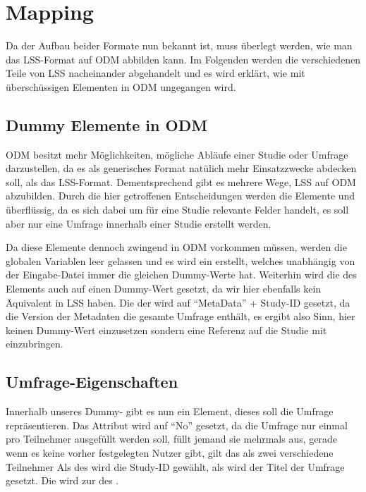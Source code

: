 \section{Mapping}

Da der Aufbau beider Formate nun bekannt ist, muss überlegt werden, wie man das LSS-Format auf ODM abbilden kann. Im Folgenden werden die verschiedenen Teile von LSS nacheinander abgehandelt und es wird erklärt, wie mit überschüssigen Elementen in ODM ungegangen wird.

\subsection{Dummy Elemente in ODM}


ODM besitzt mehr Möglichkeiten, mögliche Abläufe einer Studie oder Umfrage darzustellen, da es als generisches Format natülich mehr Einsatzzwecke abdecken soll, als das LSS-Format.
Dementsprechend gibt es mehrere Wege, LSS auf ODM abzubilden.
Durch die hier getroffenen Entscheidungen werden die Elemente  und  überflüssig,	da es sich dabei um für eine Studie relevante Felder handelt, es soll aber nur eine Umfrage innerhalb einer Studie erstellt werden.


Da diese Elemente dennoch zwingend in ODM vorkommen müssen, werden die globalen Variablen leer gelassen und es wird ein  erstellt, welches unabhängig von der Eingabe-Datei immer die gleichen Dummy-Werte hat.
Weiterhin wird die  des  Elements auch auf einen Dummy-Wert gesetzt, da wir hier ebenfalls kein Äquivalent in LSS haben.
Die  der  wird auf \enquote{MetaData} + Study-ID gesetzt, da die Version der Metadaten die gesamte Umfrage enthält, es ergibt also Sinn, hier keinen Dummy-Wert einzusetzen sondern eine Referenz auf die Studie mit einzubringen.

\subsection{Umfrage-Eigenschaften}
\label{m:survey_meta}

Innerhalb unseres Dummy- gibt es nun ein  Element, dieses soll die Umfrage repräsentieren.
Das  Attribut wird auf \enquote{No} gesetzt, da die Umfrage nur einmal pro Teilnehmer ausgefüllt werden soll, füllt jemand sie mehrmals aus, gerade wenn es keine vorher festgelegten Nutzer gibt, gilt das als zwei verschiedene Teilnehmer %
Als  des  wird die Study-ID gewählt, als  wird der Titel der Umfrage gesetzt. Die  wird zur  des .

